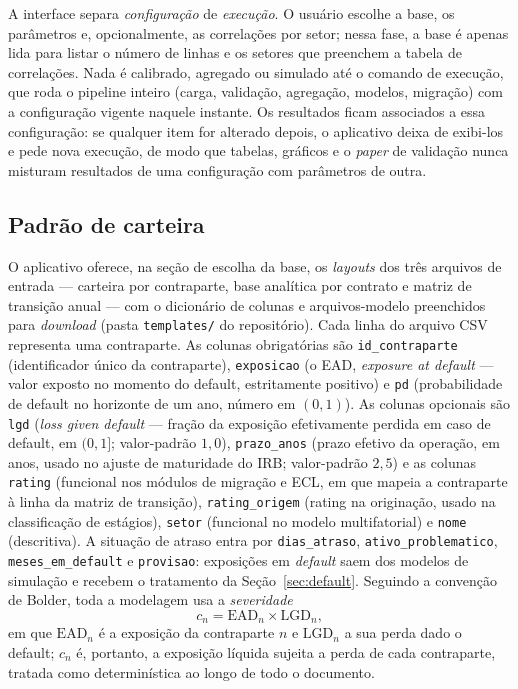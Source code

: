 \documentclass[11pt,a4paper]{article}
\begin{document}
A interface separa \emph{configuração} de \emph{execução}. O usuário escolhe a base, os parâmetros e, opcionalmente, as correlações por setor; nessa fase, a base é apenas lida para listar o número de linhas e os setores que preenchem a tabela de correlações. Nada é calibrado, agregado ou simulado até o comando de execução, que roda o pipeline inteiro (carga, validação, agregação, modelos, migração) com a configuração vigente naquele instante. Os resultados ficam associados a essa configuração: se qualquer item for alterado depois, o aplicativo deixa de exibi-los e pede nova execução, de modo que tabelas, gráficos e o \emph{paper} de validação nunca misturam resultados de uma configuração com parâmetros de outra.

\subsection{Padrão de carteira}

O aplicativo oferece, na seção de escolha da base, os \emph{layouts} dos três arquivos de entrada --- carteira por contraparte, base analítica por contrato e matriz de transição anual --- com o dicionário de colunas e arquivos-modelo preenchidos para \emph{download} (pasta \texttt{templates/} do repositório). Cada linha do arquivo CSV representa uma contraparte. As colunas obrigatórias são \texttt{id\_\allowbreak contraparte} (identificador único da contraparte), \texttt{exposicao} (o EAD, \emph{exposure at default} --- valor exposto no momento do default, estritamente positivo) e \texttt{pd} (probabilidade de default no horizonte de um ano, número em $(0,1)$). As colunas opcionais são \texttt{lgd} (\emph{loss given default} --- fração da exposição efetivamente perdida em caso de default, em $(0,1]$; valor-padrão $1{,}0$), \texttt{prazo\_anos} (prazo efetivo da operação, em anos, usado no ajuste de maturidade do IRB; valor-padrão $2{,}5$) e as colunas \texttt{rating} (funcional nos módulos de migração e ECL, em que mapeia a contraparte à linha da matriz de transição), \texttt{rating\_origem} (rating na originação, usado na classificação de estágios), \texttt{setor} (funcional no modelo multifatorial) e \texttt{nome} (descritiva). A situação de atraso entra por \texttt{dias\_atraso}, \texttt{ativo\_problematico}, \texttt{meses\_em\_default} e \texttt{provisao}: exposições em \emph{default} saem dos modelos de simulação e recebem o tratamento da Seção~\ref{sec:default}. Seguindo a convenção de Bolder, toda a modelagem usa a \emph{severidade}
\begin{equation}
c_n = \mathrm{EAD}_n \times \mathrm{LGD}_n,
\end{equation}
em que $\mathrm{EAD}_n$ é a exposição da contraparte $n$ e $\mathrm{LGD}_n$ a sua perda dado o default; $c_n$ é, portanto, a exposição líquida sujeita a perda de cada contraparte, tratada como determinística ao longo de todo o documento.
\end{document}
